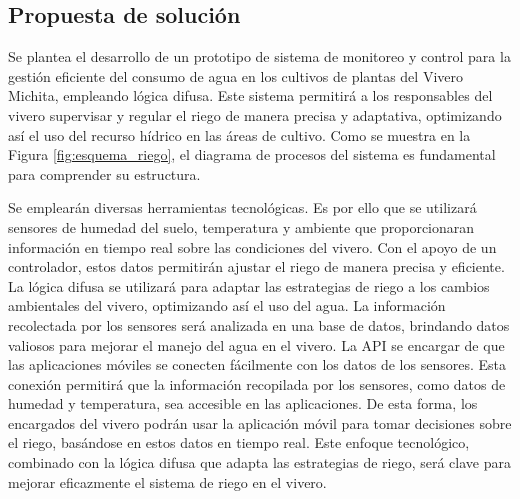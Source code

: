 \subsection{Propuesta de solución}
Se plantea el desarrollo de un prototipo de sistema de monitoreo y control para
la gestión eficiente del consumo de agua en los cultivos de plantas del Vivero
Michita, empleando lógica difusa. Este sistema permitirá a
los responsables del vivero supervisar y regular el riego de manera precisa y
adaptativa, optimizando así el uso del recurso hídrico en las áreas de cultivo.
Como se muestra en la Figura \ref{fig:esquema_riego}, el diagrama de procesos
del sistema es fundamental para comprender su estructura.

\newpage



Se emplearán diversas herramientas tecnológicas. Es por ello que se utilizará
sensores de humedad del suelo, temperatura y ambiente que proporcionaran
información en tiempo real sobre las condiciones del vivero. Con el apoyo de un
controlador, estos datos permitirán ajustar el riego de manera precisa y
eficiente. \bigbreak La lógica difusa se utilizará para adaptar las estrategias
de riego a los cambios ambientales del vivero, optimizando así el uso del agua.
La información recolectada por los sensores será analizada en una base de
datos, brindando datos valiosos para mejorar el manejo del agua en el vivero.
\bigbreak La API se encargar de que las aplicaciones móviles se conecten
fácilmente con los datos de los sensores. Esta conexión permitirá que la
información recopilada por los sensores, como datos de humedad y temperatura,
sea accesible en las aplicaciones. De esta forma, los encargados del vivero
podrán usar la aplicación móvil para tomar decisiones sobre el riego, basándose
en estos datos en tiempo real. Este enfoque tecnológico, combinado con la
lógica difusa que adapta las estrategias de riego, será clave para mejorar
eficazmente el sistema de riego en el vivero.

